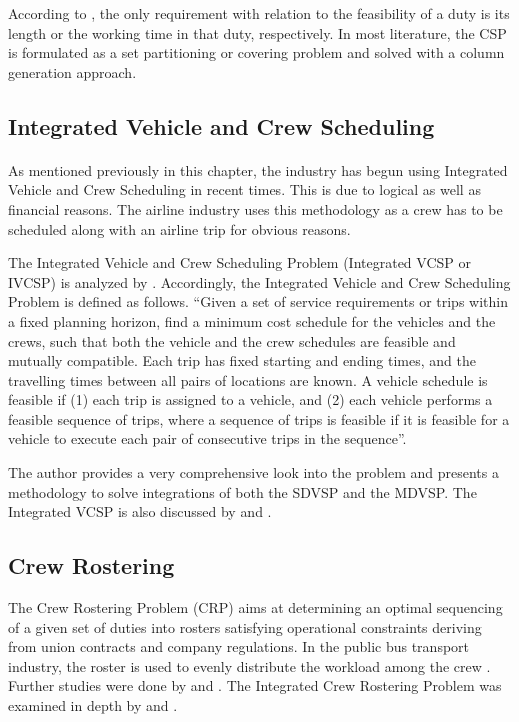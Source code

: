According to \cite{Huisman2004}, the only requirement with relation to the feasibility of a duty is its length or the working time in that duty, respectively. In most literature, the CSP is formulated as a set partitioning or covering problem and solved with a column generation approach.

\subsection {Integrated Vehicle and Crew Scheduling}

\paragraph{ } As mentioned previously in this chapter, the industry has begun using Integrated Vehicle and Crew Scheduling in recent times. This is due to logical as well as financial reasons. The airline industry uses this methodology as a crew has to be scheduled along with an airline trip for obvious reasons.

The Integrated Vehicle and Crew Scheduling Problem (Integrated VCSP or IVCSP) is analyzed by \cite{Huisman2004}. Accordingly, the Integrated Vehicle and Crew Scheduling Problem is defined as follows. “Given a set of service requirements or trips within a fixed planning horizon, find a minimum cost schedule for the vehicles and the crews, such that both the vehicle and the crew schedules are feasible and mutually compatible. Each trip has fixed starting and ending times, and the travelling times between all pairs of locations are known. A vehicle schedule is feasible if (1) each trip is assigned to a vehicle, and (2) each vehicle performs a feasible sequence of trips, where a sequence of trips is feasible if it is feasible for a vehicle to execute each pair of consecutive trips in the sequence”.

The author provides a very comprehensive look into the problem and presents a methodology to solve integrations of both the SDVSP and the MDVSP. The Integrated VCSP is also discussed by \cite{Freling2000} and \cite{Wren1997}.

\subsection {Crew Rostering}

The Crew Rostering Problem (CRP) aims at determining an optimal sequencing of a given set of duties into rosters satisfying operational constraints deriving from union contracts and company regulations. In the public bus transport industry, the roster is used to evenly distribute the workload among the crew \cite{Caprara1995}. Further studies were done by \cite{Kharraziha2003} and \cite{Tian2012}. The Integrated Crew Rostering Problem was examined in depth by \cite{Valdes2010} and \cite{Xie2012}.


